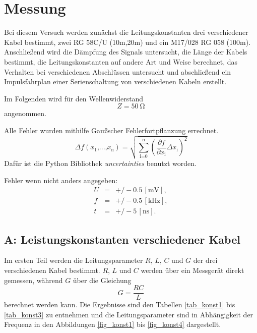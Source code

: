\FloatBarrier
\section{Messung} %
\label{sec:section_name}

Bei diesem Versuch werden zunächst die Leitungskonstanten drei verschiedener Kabel bestimmt, zwei RG 58C/U (10m,20m) und ein M17/028 RG 058 (100m).
Anschließend wird die Dämpfung des Signals untersucht, die Länge der Kabels bestimmt, die Leitungskonstanten auf andere Art und Weise berechnet, das Verhalten bei verschiedenen Abschlüssen untersucht und abschließend ein Impulsfahrplan einer Serienschaltung von verschiedenen Kabeln erstellt.

Im Folgenden wird für den Wellenwiderstand
\begin{equation}
	Z = \SI{50}{\ohm}
\end{equation}
angenommen.

Alle Fehler wurden mithilfe Gaußscher Fehlerfortpflanzung errechnet.
\begin{equation}
	\Delta f(x_\text{1}\text{,...,}x_\text{n}) = \sqrt{\sum_\text{i=0}^\text{n} \left(\frac{\partial f}{\partial x_\text{i}} \Delta x_\text{i}\right)^2}
\end{equation}
Dafür ist die Python Bibliothek \textit{uncertainties} benutzt worden.

Fehler wenn nicht anders angegeben:
\begin{eqnarray}
	U &=& +/-0.5\,[\text{mV}],\\
	f &=& +/-0.5\,[\text{kHz}],\\
	t &=& +/-5\,[\text{ns}].
\end{eqnarray}

\subsection{A: Leistungskonstanten verschiedener Kabel} %
\label{sub:a_}


Im ersten Teil werden die Leitungsparameter $R$, $L$, $C$ und $G$ der drei verschiedenen Kabel bestimmt.
$R$, $L$ und $C$ werden über ein Messgerät direkt gemessen, während $G$ über die Gleichung
\begin{equation}
	G = \frac{R C}{L}
\end{equation}
berechnet werden kann.
Die Ergebnisse sind den Tabellen \ref{tab_konst1} bis \ref{tab_konst3} zu entnehmen und die Leitungsparameter sind in Abhängigkeit der Frequenz in den Abbildungen \ref{fig_konst1} bis \ref{fig_konst4} dargestellt.


